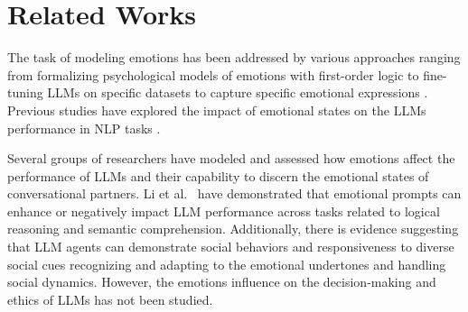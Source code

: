\documentclass{article}
\begin{document}

\section{Related Works} %


The task of modeling emotions has been addressed by various approaches ranging from formalizing psychological models of emotions with first-order logic \cite{meyer2006reasoning, steunebrink2007logic, genot2023game, ivnn2023logic} to fine-tuning LLMs %
on specific datasets to capture specific emotional expressions \cite{zhang2023dialoguellm,smith2022lies}.  %
Previous studies have explored the impact of emotional states on the LLMs performance in NLP tasks \cite{huang2024emotionally, li2023languagespecific, lei2023instructerc, croissant2023appraisalbased, vzorin2023emotional}. 

Several groups of researchers have modeled and assessed how emotions affect the performance of LLMs and their capability to discern the emotional states of conversational partners. Li et al.~\cite{li2023large,li2023good} have demonstrated that emotional prompts can enhance or negatively impact LLM performance across tasks related to logical reasoning and semantic comprehension. Additionally, there is evidence suggesting that LLM agents can demonstrate social behaviors and responsiveness to diverse social cues \cite{leng2023llm} recognizing and adapting to the emotional undertones and handling social dynamics. However, %
the emotions influence on the decision-making and ethics of LLMs has not been studied.
\end{document}
